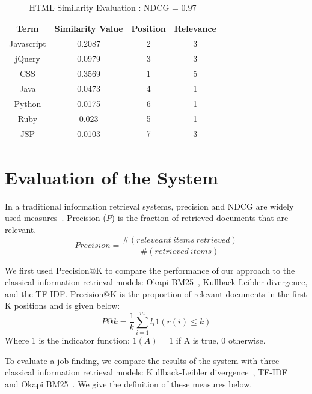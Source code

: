 \begin{table}
\centering
\caption{ HTML Similarity Evaluation : NDCG = 0.97 }
\begin{tabular}{ | c | c | c  | c |  }
 \hline
    Term      &  Similarity Value  &  Position   & Relevance     \\  \hline
  Javascript   &  0.2087           &      2      &   3        \\
     jQuery    &  0.0979           &      3      &   3         \\
     CSS     &  0.3569             &      1      &   5   \\
     Java    &  0.0473             &      4      &   1   \\
    Python   &  0.0175             &      6      &   1   \\
     Ruby    &  0.023              &      5      &   1    \\
     JSP     &  0.0103             &      7      &   3    \\
 \hline
\end{tabular}
\label{tab:simcompare2}
\end{table}


\section{Evaluation of the System}

In a traditional information retrieval systems, precision and NDCG are widely used measures~\cite{manning2008introduction}. Precision ($P$) is the fraction of retrieved documents that are relevant.
       $$  Precision =  \frac{ \#(releveant~items~ retrieved)}{ \#(retrieved~items)}$$

We first used Precision@K to compare the performance of our approach to the classical information retrieval models: Okapi BM25~\cite{robertson2009probabilistic}, Kullback-Leibler divergence, and the TF-IDF. Precision@K is the proportion of relevant documents in the first K positions and is given below:
$$ P@k = \frac{1}{k} \sum^m_{i=1} l_i 1 \left(  r(i) \leq k  \right )  $$
Where 1 is the indicator function: $1(A) = 1$ if A is true, 0 otherwise.

To evaluate a job finding, we compare the results of the system with three classical information retrieval models: Kullback-Leibler divergence~\cite{zhai2008statistical},  TF-IDF~\cite{manning2008introduction} and Okapi BM25~\cite{robertson1995okapi}. We give the definition of these measures below.

